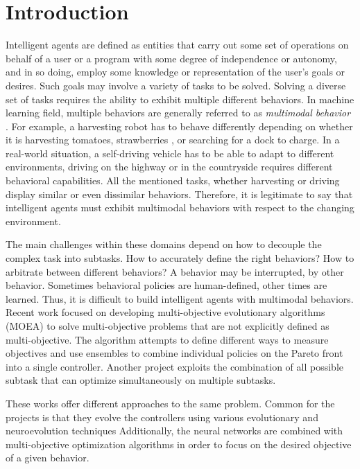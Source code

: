 \documentclass[format=acmsmall, review=false, screen=true]{acmart}
\begin{document}
\section{Introduction}

Intelligent agents are defined as entities that carry out some set of operations on behalf of a user or a program with some degree of independence or autonomy, and in so doing, employ some knowledge or representation of the user's goals or desires. Such goals may involve a variety of tasks to be solved. Solving a diverse set of tasks requires the ability to exhibit multiple different behaviors. In machine learning field, multiple behaviors are generally referred to as \emph{multimodal behavior} \cite{li:alife14}. For example, a harvesting robot has to behave differently depending on whether it is harvesting tomatoes, strawberries \cite{dogtooth}, or searching for a dock to charge. In a real-world situation, a self-driving vehicle has to be able to adapt to different environments, driving on the highway or in the countryside requires different behavioral capabilities. All the mentioned tasks, whether harvesting or driving display similar or even dissimilar behaviors. Therefore, it is legitimate to say that intelligent agents must exhibit multimodal behaviors with respect to the changing environment.

The main challenges within these domains depend on how to decouple the complex task into subtasks. How to accurately define the right behaviors? How to arbitrate between different behaviors? A behavior may be interrupted, by other behavior. Sometimes behavioral policies are human-defined, other times are learned. Thus, it is difficult to build intelligent agents with multimodal behaviors. Recent work focused on developing multi-objective evolutionary algorithms (MOEA) \cite{tonder2013multi} to solve multi-objective problems that are not explicitly defined as multi-objective. The algorithm attempts to define different ways to measure objectives and use ensembles to combine individual policies on the Pareto front into a single controller. Another project \cite{Huizinga2018EvolvingMR} exploits the combination of all possible subtask that can optimize simultaneously on multiple subtasks. 

These works offer different approaches to the same problem. Common for the projects is that they evolve the controllers using various evolutionary and neuroevolution techniques Additionally, the neural networks are combined with multi-objective optimization algorithms in order to focus on the desired objective of a given behavior.
\end{document}
